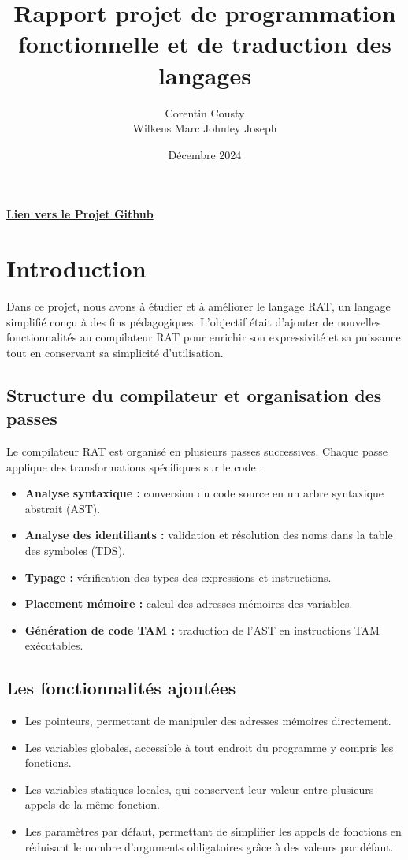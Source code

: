 \documentclass[a4paper,12pt]{article}
\title{Rapport projet de programmation fonctionnelle et de traduction des langages}
\author{Corentin Cousty \\ Wilkens Marc Johnley Joseph}
\date{D\'ecembre 2024}
\begin{document}
\maketitle
\href{https://github.com/Kaldah/Projet_TDL}{\textbf{Lien vers le Projet Github}}
\tableofcontents
\newpage

\section{Introduction}
Dans ce projet, nous avons \`a \'etudier et \`a am\'eliorer le langage RAT, un langage simplifi\'e con\c{c}u à des fins p\'edagogiques. L'objectif \'etait d'ajouter de nouvelles fonctionnalit\'es au compilateur RAT pour enrichir son expressivit\'e et sa puissance tout en conservant sa simplicit\'e d'utilisation.


\subsection{Structure du compilateur et organisation des passes}
Le compilateur RAT est organis\'e en plusieurs passes successives. Chaque passe applique des transformations sp\'ecifiques sur le code :
\begin{itemize}
    \item \textbf{Analyse syntaxique :} conversion du code source en un arbre syntaxique abstrait (AST).
    \item \textbf{Analyse des identifiants :} validation et r\'esolution des noms dans la table des symboles (TDS).
    \item \textbf{Typage :} v\'erification des types des expressions et instructions.
    \item \textbf{Placement m\'emoire :} calcul des adresses m\'emoires des variables.
    \item \textbf{G\'en\'eration de code TAM :} traduction de l'AST en instructions TAM ex\'ecutables.
\end{itemize}

\subsection{Les fonctionnalit\'es ajout\'ees}
\begin{itemize}
    \item Les pointeurs, permettant de manipuler des adresses m\'emoires directement.
    \item Les variables globales, accessible \`a tout endroit du programme y compris les fonctions.
    \item Les variables statiques locales, qui conservent leur valeur entre plusieurs appels de la m\^eme fonction.
    \item Les param\`etres par d\'efaut, permettant de simplifier les appels de fonctions en r\'eduisant le nombre d'arguments obligatoires grâce à des valeurs par défaut.
\end{itemize}
\end{document}
